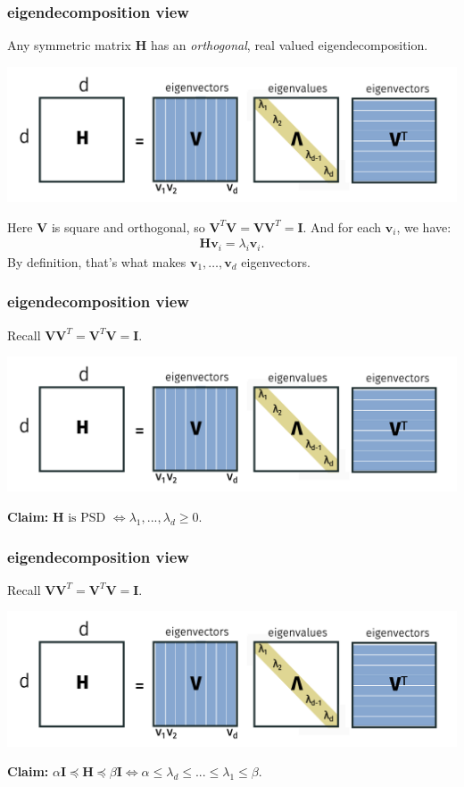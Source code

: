 \documentclass[compress]{beamer}
\newcommand{\bv}[1]{\mathbf{#1}}
\begin{document}
\begin{frame}[t]
	\frametitle{eigendecomposition view}
	Any symmetric matrix $\bv{H}$ has an \emph{orthogonal}, real valued eigendecomposition. 
	\begin{center}
		\includegraphics[width=.9\textwidth]{eigendecomp.png}
	\end{center}
	Here $\bv{V}$ is square and orthogonal, so $\bv{V}^T\bv{V} = \bv{V}\bv{V}^T = \bv{I}$. And for each $\bv{v}_i$, we have:
	\begin{align*}
		\bv{H}\bv{v}_i = \lambda_i \bv{v}_i. 
	\end{align*}
	By definition, that's what makes $\bv{v}_1, \ldots, \bv{v}_d$ eigenvectors.	
\end{frame}

\begin{frame}[t]
	\frametitle{eigendecomposition view}
	Recall $\bv{V}\bv{V}^T = \bv{V}^T\bv{V} = \bv{I}$.
	\begin{center}
		\includegraphics[width=.9\textwidth]{eigendecomp.png}
	\end{center}
	\textbf{Claim:}	$\bv{H} \text{ is PSD } \Leftrightarrow \lambda_1, ..., \lambda_d \geq 0$. 
\end{frame}

\begin{frame}[t]
	\frametitle{eigendecomposition view}
	Recall $\bv{V}\bv{V}^T = \bv{V}^T\bv{V} = \bv{I}$.
	\begin{center}
		\includegraphics[width=.9\textwidth]{eigendecomp.png}
	\end{center}
	\textbf{Claim:}	$\alpha\bv{I} \preceq \bv{H} \preceq \beta \bv{I} \Leftrightarrow \alpha \leq \lambda_d \leq ... \leq \lambda_1 \leq \beta$. 
\end{frame}
\end{document}
